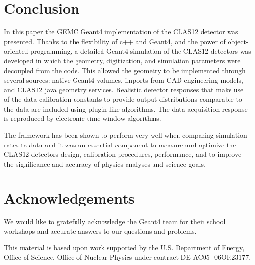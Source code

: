 \section{Conclusion}
In this paper the GEMC Geant4 implementation of the CLAS12 detector was presented.
Thanks to the flexibility of c++ and Geant4, and the power of object-oriented programming,
a detailed Geant4 simulation of the CLAS12 detectors was developed in which the geometry,
digitization, and simulation parameters were decoupled from the code.
This allowed the geometry to be implemented through several sources: native Geant4 volumes, imports from CAD engineering models,
and CLAS12 java geometry services. Realistic detector responses that
make use of the data calibration constants to provide output distributions comparable to the data are included
using plugin-like algorithms. The data acquisition response is reproduced by electronic time window algorithms.

The framework has been shown to perform very well when comparing simulation rates to data
and it was an essential component to measure and optimize the CLAS12 detectors design, calibration procedures, performance,
and to improve the significance and accuracy of physics analyses and science goals.

\section{Acknowledgements}

We would like to gratefully acknowledge the Geant4 team
for their school workshops and accurate answers to our questions and problems.

This material is based upon work supported by the U.S. Department of Energy,
Office of Science, Office of Nuclear Physics under contract DE-AC05- 06OR23177.

